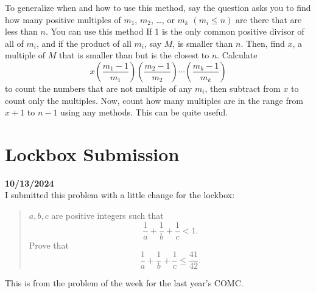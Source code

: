\documentclass[12pt, oneside]{article}
\begin{document}
To generalize when and how to use this method, say the question asks you to find how many positive multiples of $m_1$, $m_2$, \dots, or $m_k$ $(m_i \leq n)$ are there that are less than $n$. You can use this method If 1 is the only common positive divisor of all of $m_i$, and if the product of all $m_i$, say $M$, is smaller than $n$. Then, find $x$, a multiple of $M$ that is smaller than but is the closest to $n$. Calculate
\[x\left(\frac{m_1-1}{m_1}\right)\left(\frac{m_2-1}{m_2}\right)\cdots\left(\frac{m_k-1}{m_k}\right)\]
to count the numbers that are not multiple of any $m_i$, then subtract from $x$ to count only the multiples. Now, count how many multiples are in the range from $x+1$ to $n-1$ using any methods. This can be quite useful.
\section*{Lockbox Submission}
\textbf{10/13/2024}\\
I submitted this problem with a little change for the lockbox:
\begin{quote}
$a, b, c$ are positive integers such that
\[\frac{1}{a}+\frac{1}{b}+\frac{1}{c}<1.\]
Prove that
\[\frac{1}{a}+\frac{1}{b}+\frac{1}{c}\leq\frac{41}{42}.\]
\end{quote}
This is from the problem of the week for the last year's COMC.
\end{document}
